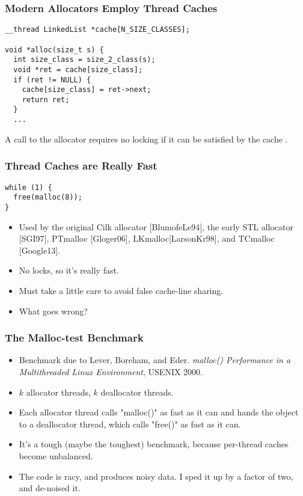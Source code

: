 \documentclass[xcolor=dvipsnames,14pt]{beamer}
\begin{document}
\begin{frame}[fragile]
\frametitle{Modern Allocators Employ Thread Caches}

\begin{verbatim}
__thread LinkedList *cache[N_SIZE_CLASSES];

void *alloc(size_t s) {
  int size_class = size_2_class(s);
  void *ret = cache[size_class];
  if (ret != NULL) {
    cache[size_class] = ret->next;
    return ret;
  }
  ...
\end{verbatim}

A call to the allocator requires no locking if it can be satisfied by the cache .
\end{frame}

\begin{frame}[fragile]
\frametitle{Thread Caches are Really Fast}

\begin{verbatim}
while (1) {
  free(malloc(8));
}
\end{verbatim}

\begin{itemize}
\item Used by the original Cilk allocator [BlumofeLe94], the early STL allocator [SGI97], PTmalloc [Gloger06], LKmalloc[LarsonKr98], and TCmalloc [Google13].
\item No locks, so it's really fast.
\item Must take a little care to avoid false cache-line sharing.
\item What goes wrong?
\end{itemize}
\end{frame}

\begin{frame}[fragile]
\frametitle{The Malloc-test Benchmark}

\begin{itemize}
\item Benchmark due to Lever, Boreham, and Eder.
\textit{malloc() Performance in a Multithreaded Linux
  Environment}, USENIX 2000.

\item $k$ allocator threads, $k$ deallocator threads.

\item Each allocator thread calls "malloc()" as fast as it can and hands the object to a deallocator thread, which calls "free()" as fast as it can.

\item It's a tough (maybe the toughest) benchmark, because per-thread caches become unbalanced.

\item The code is racy, and produces noisy data.  I sped it up by a factor of two, and de-noised it.
\end{itemize}

\end{frame}
\end{document}
